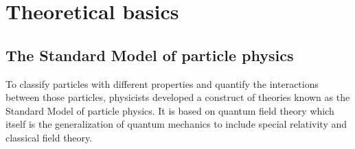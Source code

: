 \chapter{Theoretical basics}


\section{The Standard Model of particle physics}

To classify particles with different properties and quantify the interactions between those particles, physicists developed a construct of theories known as the Standard Model of particle physics.
It is based on quantum field theory which itself is the generalization of quantum mechanics to include special relativity and classical field theory. 



